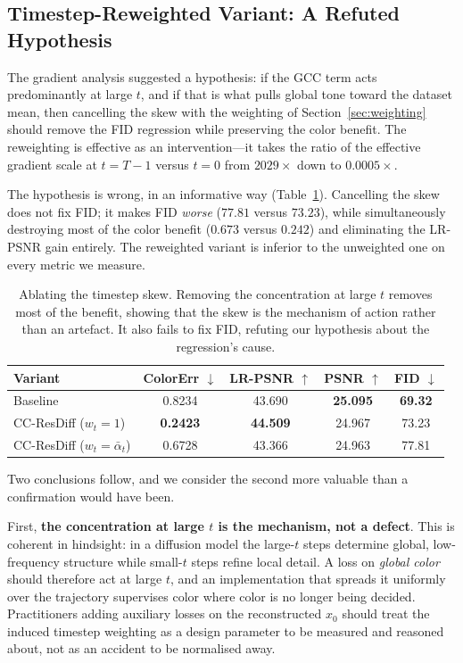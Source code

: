 \documentclass[11pt]{article}
\newcommand{\best}[1]{\textbf{#1}}
\begin{document}
\subsection{Timestep-Reweighted Variant: A Refuted Hypothesis}
\label{sec:snr}

The gradient analysis suggested a hypothesis: if the GCC term acts predominantly
at large $t$, and if that is what pulls global tone toward the dataset mean, then
cancelling the skew with the weighting of Section~\ref{sec:weighting} should
remove the FID regression while preserving the color benefit. The reweighting is
effective as an intervention---it takes the ratio of the effective gradient scale
at $t{=}T{-}1$ versus $t{=}0$ from $2029\times$ down to $0.0005\times$.

The hypothesis is wrong, in an informative way (Table~\ref{tab:snr}). Cancelling
the skew does not fix FID; it makes FID \emph{worse} ($77.81$ versus $73.23$),
while simultaneously destroying most of the color benefit ($0.673$ versus
$0.242$) and eliminating the LR-PSNR gain entirely. The reweighted variant is
inferior to the unweighted one on every metric we measure.

\begin{table}[t]
\centering
\small
\begin{tabular}{lcccc}
\toprule
Variant & ColorErr $\downarrow$ & LR-PSNR $\uparrow$ & PSNR $\uparrow$ & FID $\downarrow$ \\
\midrule
Baseline                       & 0.8234 & 43.690 & \best{25.095} & \best{69.32} \\
CC-ResDiff ($w_t{=}1$)         & \best{0.2423} & \best{44.509} & 24.967 & 73.23 \\
CC-ResDiff ($w_t{=}\bar\alpha_t$) & 0.6728 & 43.366 & 24.963 & 77.81 \\
\bottomrule
\end{tabular}
\caption{Ablating the timestep skew. Removing the concentration at large $t$
removes most of the benefit, showing that the skew is the mechanism of action
rather than an artefact. It also fails to fix FID, refuting our hypothesis about
the regression's cause.}
\label{tab:snr}
\end{table}

Two conclusions follow, and we consider the second more valuable than a
confirmation would have been.

First, \textbf{the concentration at large $t$ is the mechanism, not a defect}.
This is coherent in hindsight: in a diffusion model the large-$t$ steps determine
global, low-frequency structure while small-$t$ steps refine local detail. A loss
on \emph{global color} should therefore act at large $t$, and an implementation
that spreads it uniformly over the trajectory supervises color where color is no
longer being decided. Practitioners adding auxiliary losses on the reconstructed
$x_0$ should treat the induced timestep weighting as a design parameter to be
measured and reasoned about, not as an accident to be normalised away.
\end{document}
